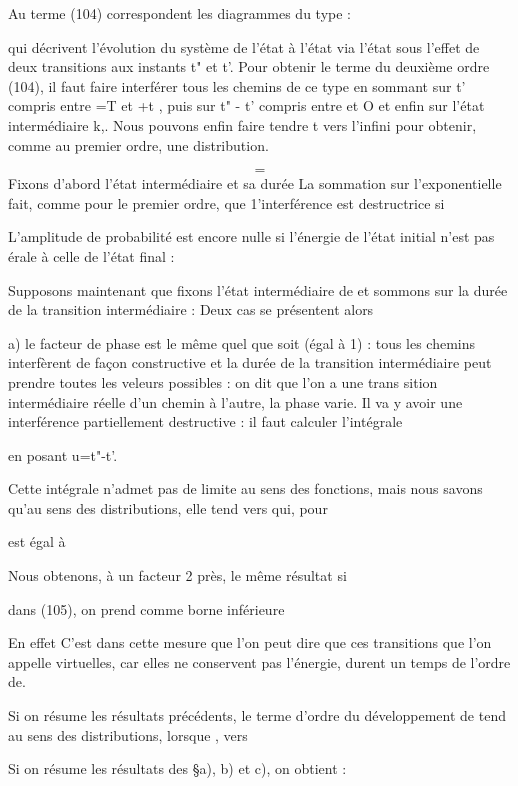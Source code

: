 Au terme (104) correspondent les diagrammes du type :

qui décrivent l'évolution du système de l'état  à l'état
 via l'état  sous l'effet de deux transitions aux
instants t" et t'. Pour obtenir le terme du deuxième ordre (104),
il faut faire interférer tous les chemins de ce type en sommant
sur t' compris entre =T et +t , puis sur t" - t' compris entre
 et O et enfin sur l'état intermédiaire k,. Nous pouvons enfin
faire tendre t vers l'infini pour obtenir, comme au premier ordre,
une distribution.


\[
\tag{(105)}=
\]
Fixons d'abord l'état intermédiaire  et sa durée
La sommation sur l'exponentielle  fait, comme
pour le premier ordre, que 1'interférence est destructrice si

L'amplitude de probabilité est encore nulle si l'énergie de l'état
initial n'est pas érale à celle de l'état final :

Supposons maintenant que  fixons l'état intermédiaire  de
et sommons sur la durée de la transition intermédiaire  : Deux
cas se présentent alors

a) le facteur de phase est le même quel que soit
(égal à 1) : tous les chemins interfèrent de façon constructive et la durée
de la transition intermédiaire peut prendre toutes les veleurs possibles :
on dit que l'on a une trans sition intermédiaire réelle
d'un chemin à l'autre, la phase varie. Il va y avoir une
interférence partiellement destructive : il faut calculer l'intégrale

en posant u=t"-t'.

Cette intégrale n'admet pas de limite au sens des fonctions, mais nous savons
qu'au sens des distributions, elle tend vers  qui, pour

 est égal à 


Nous obtenons, à un facteur 2 près, le même résultat si

dans  (105), on prend comme borne inférieure

En effet
C'est dans cette mesure que l'on peut dire que ces transitions
que l'on appelle virtuelles, car elles ne conservent pas l'énergie, durent un temps de l'ordre de.

 

Si on résume les résultats précédents, le terme d'ordre
 du développement de  tend au sens des distributions, lorsque , vers

Si on résume les résultats des \S a), b) et c), on obtient :


